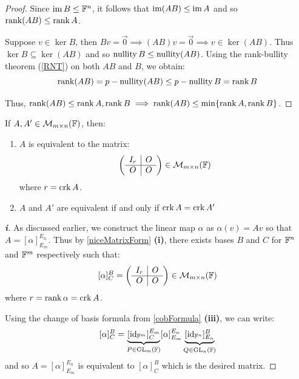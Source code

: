 \documentclass[../main.tex]{subfiles}
\begin{document}
\begin{proof}
  Since $\operatorname{im} B \leq \mathbb{F}^n$, it follows that $\operatorname{im}(AB) \leq \operatorname{im} A$ and so $\operatorname{rank}(AB) \leq \operatorname{rank} A$.

  Suppose $v \in \ker B$, then $Bv = \vec{0} \implies (AB)v = \vec{0} \implies v \in \ker(AB)$.
  Thus $\ker B \subseteq \ker(AB)$ and so $\operatorname{nullity} B \leq \operatorname{nullity}(AB)$.
  Using the rank-bullity theorem (\cref{RNT}) on both $AB$ and $B$, we obtain:
  \[
    \operatorname{rank}(AB) = p - \operatorname{nullity}(AB) \leq p - \operatorname{nullity} B = \operatorname{rank} B
  \]

  Thus, $\operatorname{rank}(AB) \leq \operatorname{rank} A, \operatorname{rank} B \implies \operatorname{rank}(AB) \leq \min\{\operatorname{rank} A, \operatorname{rank} B\}$.
\end{proof}
\begin{theorem}
  If $A, A' \in \mathcal{M}_{m \times n}(\mathbb{F})$, then: \label{equivNice}
  \begin{enumerate}
    \item $A$ is equivalent to the matrix:
      \[
        \left(\begin{array}{c|c}
        I_r & O \\ \hline
        O & O
        \end{array}\right) \in \mathcal{M}_{m \times n}(\mathbb{F})
      \]
      where $r = \operatorname{crk} A$.
    \item $A$ and $A'$ are equivalent if and only if $\operatorname{crk} A = \operatorname{crk} A'$
  \end{enumerate}
\end{theorem}
\begin{proof}[\textbf{i}]
  As discussed earlier, we construct the linear map $\alpha$ as $\alpha(v) = A v$ so that $A = [\alpha]^{E_n}_{E_m}$.
  Thus by \cref{niceMatrixForm} \textbf{(i)}, there exists bases $B$ and $C$ for $\mathbb{F}^n$ and $\mathbb{F}^m$ respectively such that:
  \[
    [\alpha]^{B}_{C} = \left(\begin{array}{c|c}
    I_r & O \\ \hline
    O & O
    \end{array}\right) \in \mathcal{M}_{m \times n}(\mathbb{F})
  \]
  where $r = \operatorname{rank} \alpha = \operatorname{crk} A$.

  Using the change of basis formula from \cref{cobFormula} \textbf{(iii)}, we can write:
  \[
    [\alpha]^{B}_{C} = \underbrace{[\mathrm{id}_{\mathbb{F}^m}]^{E_m}_{C}}_{P \in \mathrm{GL}_m(\mathbb{F})}[\alpha]^{E_n}_{E_m}\underbrace{[\mathrm{id}_{\mathbb{F}^n}]^{B}_{E_n}}_{Q \in \mathrm{GL}_n(\mathbb{F})}
  \]
  and so $A = [\alpha]^{E_n}_{E_m}$ is equivalent to $[\alpha]^{B}_{C}$ which is the desired matrix.
\end{proof}
\end{document}
